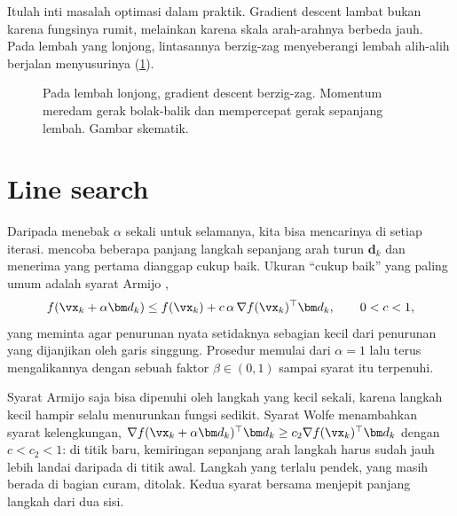 Itulah inti masalah optimasi dalam praktik. Gradient descent lambat bukan karena fungsinya rumit,
melainkan karena skala arah-arahnya berbeda jauh. Pada lembah yang lonjong, lintasannya
berzig-zag menyeberangi lembah alih-alih berjalan menyusurinya (\cref{fig:zigzag}).

\begin{figure}[ht]
\centering
{}
\caption{Pada lembah lonjong, gradient descent berzig-zag. Momentum meredam gerak bolak-balik
dan mempercepat gerak sepanjang lembah. Gambar skematik.}
\label{fig:zigzag}
\end{figure}

\section{Line search}

Daripada menebak $\alpha$ sekali untuk selamanya, kita bisa mencarinya di setiap iterasi.
 mencoba beberapa panjang langkah sepanjang arah turun $\bm d_k$ dan menerima
yang pertama dianggap cukup baik. Ukuran ``cukup baik'' yang paling umum adalah syarat
Armijo \citep{armijo1966},
\[
f(\vx_k+\alpha\bm d_k)\le f(\vx_k)+c\,\alpha\,\nabla f(\vx_k)^\top\bm d_k,\qquad 0<c<1,
\]
yang meminta agar penurunan nyata setidaknya sebagian kecil dari penurunan yang dijanjikan oleh
garis singgung. Prosedur  memulai dari $\alpha=1$ lalu terus mengalikannya
dengan sebuah faktor $\beta\in(0,1)$ sampai syarat itu terpenuhi.

Syarat Armijo saja bisa dipenuhi oleh langkah yang kecil sekali, karena langkah kecil hampir selalu menurunkan
fungsi sedikit. Syarat Wolfe menambahkan syarat kelengkungan,
$\nabla f(\vx_k+\alpha\bm d_k)^\top\bm d_k\ge c_2\nabla f(\vx_k)^\top\bm d_k$ dengan $c<c_2<1$: di titik baru, kemiringan
sepanjang arah langkah harus sudah jauh lebih landai daripada di titik awal. Langkah yang terlalu pendek, yang masih
berada di bagian curam, ditolak. Kedua syarat bersama menjepit panjang langkah dari dua sisi.

